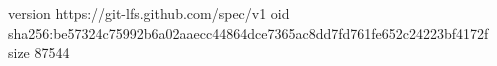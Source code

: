 version https://git-lfs.github.com/spec/v1
oid sha256:be57324c75992b6a02aaecc44864dce7365ac8dd7fd761fe652c24223bf4172f
size 87544
